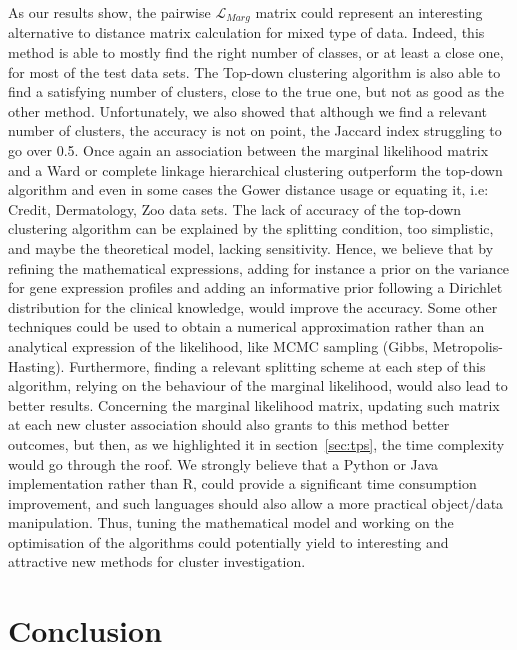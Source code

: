 \documentclass[twocolumn,12pt]{article}
\begin{document}
As our results show, the pairwise $\mathcal{L}_{Marg}$ matrix could represent an interesting alternative to distance matrix calculation for mixed type of data.
Indeed, this method is able to mostly find the right number of classes, or at least a close one, for most of the test data sets.
The Top-down clustering algorithm is also able to find a satisfying number of clusters, close to the true one, but not as good as the other method.
Unfortunately, we also showed that although we find a relevant number of clusters, the accuracy is not on point, the Jaccard index struggling to go over 0.5.
Once again an association between the marginal likelihood matrix and a Ward or complete linkage hierarchical clustering outperform the top-down algorithm and even in some cases the Gower distance usage or equating it, i.e: Credit, Dermatology, Zoo data sets.
The lack of accuracy of the top-down clustering algorithm can be explained by the splitting condition, too simplistic, and maybe the theoretical model, lacking sensitivity.
Hence, we believe that by refining the mathematical expressions, adding for instance a prior on the variance for gene expression profiles and adding an informative prior following a Dirichlet distribution for the clinical knowledge, would improve the accuracy.
Some other techniques could be used to obtain a numerical approximation rather than an analytical expression of the likelihood, like MCMC sampling (Gibbs, Metropolis-Hasting).
Furthermore, finding a relevant splitting scheme at each step of this algorithm, relying on the behaviour of the marginal likelihood, would also lead to better results.
Concerning the marginal likelihood matrix, updating such matrix at each new cluster association should also grants to this method better outcomes, but then, as we highlighted it in section~\ref{sec:tps}, the time complexity would go through the roof.
We strongly believe that a Python or Java implementation rather than R, could provide a significant time consumption improvement, and such languages should also allow a more practical object/data manipulation.
Thus, tuning the mathematical model and working on the optimisation of the algorithms could potentially yield to interesting and attractive new methods for cluster investigation.

\section{Conclusion}
\end{document}
